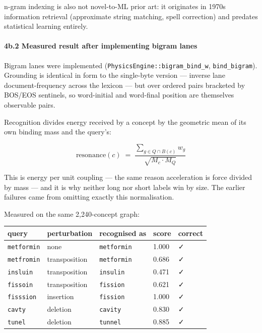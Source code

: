\documentclass[
  11pt,
  a4paper,
]{article}
\begin{document}
n-gram indexing is also not novel-to-ML prior art: it originates in
1970s information retrieval (approximate string matching, spell
correction) and predates statistical learning entirely.

\paragraph{4b.2 Measured result after implementing bigram
lanes}\label{b.2-measured-result-after-implementing-bigram-lanes}

Bigram lanes were implemented (\texttt{PhysicsEngine::bigram\_bind\_w},
\texttt{bind\_bigram}). Grounding is identical in form to the
single-byte version --- inverse lane document-frequency across the
lexicon --- but over ordered pairs bracketed by BOS/EOS sentinels, so
word-initial and word-final position are themselves observable pairs.

Recognition divides energy received by a concept by the geometric mean
of its own binding mass and the query's:

\[
\text{resonance}(c) \;=\; \frac{\sum_{g \in Q \cap B(c)} w_g}{\sqrt{M_c \cdot M_Q}}
\]

This is energy per unit coupling --- the same reason acceleration is
force divided by mass --- and it is why neither long nor short labels
win by size. The earlier failures came from omitting exactly this
normalisation.

Measured on the same 2,240-concept graph:

\begin{longtable}[]{@{}lllll@{}}
\toprule\noalign{}
query & perturbation & recognised as & score & correct \\
\midrule\noalign{}
\endhead
\bottomrule\noalign{}
\endlastfoot
\texttt{metformin} & none & \texttt{metformin} & 1.000 & ✓ \\
\texttt{metfromin} & transposition & \texttt{metformin} & 0.686 & ✓ \\
\texttt{insluin} & transposition & \texttt{insulin} & 0.471 & ✓ \\
\texttt{fissoin} & transposition & \texttt{fission} & 0.621 & ✓ \\
\texttt{fisssion} & insertion & \texttt{fission} & 1.000 & ✓ \\
\texttt{cavty} & deletion & \texttt{cavity} & 0.830 & ✓ \\
\texttt{tunel} & deletion & \texttt{tunnel} & 0.885 & ✓ \\
\end{longtable}
\end{document}
